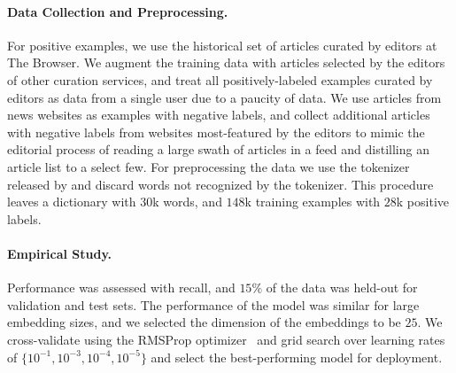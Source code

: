 \paragraph{Data Collection and Preprocessing.} For positive examples, we use the historical set of articles curated by editors at The Browser. We augment the training data with articles selected by the editors of other curation services, and treat all positively-labeled examples curated by editors as data from a single user due to a paucity of data. We use articles from news websites as examples with negative labels, and collect additional articles with negative labels from websites most-featured by the editors to mimic the editorial process of reading a large swath of articles in a feed and distilling an article list to a select few. For preprocessing the data we use the tokenizer released by \citet{devlin2019bert:} and discard words not recognized by the tokenizer. This procedure leaves a dictionary with $30$k words, and $148$k training examples with $28$k positive labels.

\paragraph{Empirical Study.} Performance was assessed with recall, and $15\%$ of the data was held-out for validation and test sets. The performance of the model was similar for large embedding sizes, and we selected the dimension of the embeddings to be $25$. We cross-validate using the RMSProp optimizer~\citep{tieleman2012lecture} and grid search over learning rates of $\{10^{-1}, 10^{-3}, 10^{-4}, 10^{-5}\}$ and select the best-performing model for deployment.

